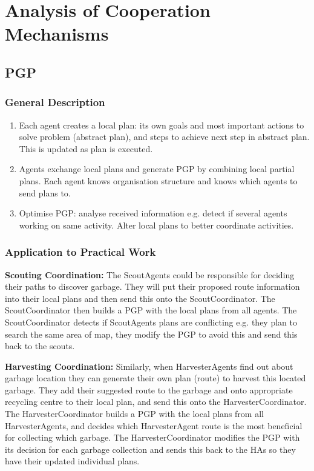 \section{Analysis of Cooperation Mechanisms}
\label{sec:allCoop}



\subsection{PGP}

\subsubsection{General Description}

\begin{enumerate}
	\item Each agent creates a local plan: its own goals and most important actions to solve problem (abstract plan), and steps to achieve next step in abstract plan. This is updated as plan is executed.
	\item Agents exchange local plans and generate PGP by combining local partial plans. Each agent knows organisation structure and knows which agents to send plans to.
	\item Optimise PGP: analyse received information e.g. detect if several agents working on same activity. Alter local plans to better coordinate activities.

\end{enumerate}

\subsubsection{Application to Practical Work}

\textbf{Scouting Coordination:} The ScoutAgents could be responsible for deciding their paths to discover garbage. They will put their proposed route information into their local plans and then send this onto the ScoutCoordinator. The ScoutCoordinator then builds a PGP with the local plans from all agents. The ScoutCoordinator detects if ScoutAgents plans are conflicting e.g. they plan to search the same area of map, they modify the PGP to avoid this and send this back to the scouts. 

\textbf{Harvesting Coordination:} Similarly, when HarvesterAgents find out about garbage location they can generate their own plan (route) to harvest this located garbage. They add their suggested route to the garbage and onto appropriate recycling centre to their local plan, and send this onto the HarvesterCoordinator. The HarvesterCoordinator builds a PGP with the local plans from all HarvesterAgents, and decides which HarvesterAgent route is the most beneficial for collecting which garbage. The HarvesterCoordinator modifies the PGP with its decision for each garbage collection and sends this back to the HAs so they have their updated individual plans. 

